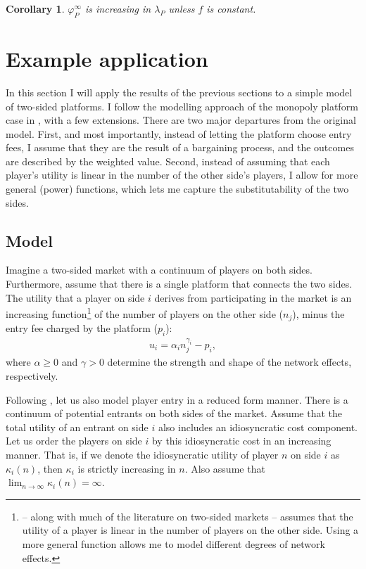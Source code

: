 \documentclass[a4paper]{article}
\newtheorem{corollary}{Corollary}
\begin{document}
\begin{corollary}
    \label{cor:platform_value_multiple_sides_weighted}
    $\varphi_P^\infty$ is increasing in $\lambda_P$ unless $f$ is constant.
\end{corollary}


\section{Example application}

In this section I will apply the results of the previous sections to a simple model of two-sided platforms.
I follow the modelling approach of the monopoly platform case in \textcite{armstrong2006competition}, with a few extensions.
There are two major departures from the original model.
First, and most importantly, instead of letting the platform choose entry fees, I assume that they are the result of a bargaining process, and the outcomes are described by the weighted value.
Second, instead of assuming that each player's utility is linear in the number of the other side's players, I allow for more general (power) functions, which lets me capture the substitutability of the two sides.

\subsection{Model}

Imagine a two-sided market with a continuum of players on both sides.
Furthermore, assume that there is a single platform that connects the two sides.
The utility that a player on side $i$ derives from participating in the market is an increasing function\footnote{
    \textcite{armstrong2006competition} -- along with much of the literature on two-sided markets \parencite[e.g.][]{rochet2003platform,hagiu2006pricing} -- assumes that the utility of a player is linear in the number of players on the other side.
    Using a more general function allows me to model different degrees of network effects.
} of the number of players on the other side ($n_j$), minus the entry fee charged by the platform ($p_i$):
\begin{align*}
    u_i = \alpha_i n_j ^ {\gamma_i} - p_i,
\end{align*}
where $\alpha \geq 0$ and $\gamma > 0$ determine the strength and shape of the network effects, respectively.

Following \textcite{armstrong2006competition}, let us also model player entry in a reduced form manner.
There is a continuum of potential entrants on both sides of the market.
Assume that the total utility of an entrant on side $i$ also includes an idiosyncratic cost component.
Let us order the players on side $i$ by this idiosyncratic cost in an increasing manner.
That is, if we denote the idiosyncratic utility of player $n$ on side $i$ as $\kappa_i(n)$, then $\kappa_i$ is strictly increasing in $n$.
Also assume that $\lim_{n \to \infty} \kappa_i(n) = \infty$.
\end{document}
